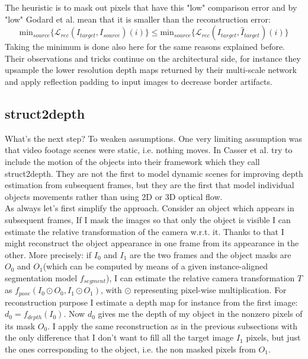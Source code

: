 The heuristic is to mask out pixels that have this "low" comparison error and by "low" Godard et al. mean that it is smaller than the reconstruction error:
\[
	\text{min}_{source} \{ \mathcal{L}_{rec}(I_{target}, I_{source})(i) \}
		\leq
	\text{min}_{source} \{ \mathcal{L}_{rec}(I_{target}, \hat{I}_{target})(i) \}
\]
Taking the minimum is done also here for the same reasons explained before. Their observations and tricks continue on the architectural side, for instance they upsample the lower resolution depth maps returned by their multi-scale network and apply reflection padding to input images to decrease border artifacts.

\subsection{struct2depth}
What's the next step? To weaken assumptions. One very limiting assumption was that video footage scenes were static, i.e. nothing moves. In \cite{struct2depth} Casser et al. try to include the motion of the objects into their framework which they call struct2depth. They are not the first to model dynamic scenes for improving depth estimation from subsequent frames, but they are the first that model individual objects movements rather than using 2D or 3D optical flow.\\
As always let's first simplify the approach. Consider an object which appears in subsequent frames, If I mask the images so that only the object is visible I can estimate the relative transformation of the camera w.r.t. it. Thanks to that I might reconstruct the object appearance in one frame from its appearance in the other. More precisely: if $I_{0}$ and $I_{1}$ are the two frames and the object masks are $O_{0}$ and $O_{1}$(which can be computed by means of a given instance-aligned segmentation model $f_{segment}$), I can estimate the relative camera transformation $T$ as $f_{pose}(I_{0} \odot O_{0}, I_{1} \odot O_{1})$, with $\odot$ representing pixel-wise multiplication. For reconstruction purpose I estimate a depth map for instance from the first image: $d_{0} = f_{depth}(I_{0})$. Now $d_{0}$ gives me the depth of my object in the nonzero pixels of its mask $O_{0}$. I apply the same reconstruction as in the previous subsections with the only difference that I don't want to fill all the target image $I_{1}$ pixels, but just the ones corresponding to the object, i.e. the non masked pixels from $O_{1}$.\\
